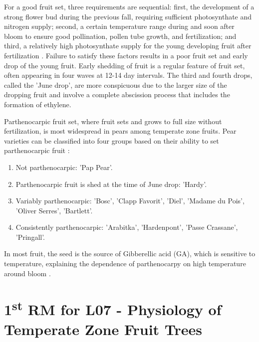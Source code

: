 \vspace{0.5em}
For a good fruit set, three requirements are sequential: first, the development of a strong flower bud during the previous fall, requiring sufficient photosynthate and nitrogen supply; second, a certain temperature range during and soon after bloom to ensure good pollination, pollen tube growth, and fertilization; and third, a relatively high photosynthate supply for the young developing fruit after fertilization \cite*{rmb_01_physiology_temperate_zone_fruit_trees}. Failure to satisfy these factors results in a poor fruit set and early drop of the young fruit. Early shedding of fruit is a regular feature of fruit set, often appearing in four waves at 12-14 day intervals. The third and fourth drops, called the 'June drop', are more conspicuous due to the larger size of the dropping fruit and involve a complete abscission process that includes the formation of ethylene.

\vspace{0.5em}
Parthenocarpic fruit set, where fruit sets and grows to full size without fertilization, is most widespread in pears among temperate zone fruits. Pear varieties can be classified into four groups based on their ability to set parthenocarpic fruit \cite*{rmb_01_physiology_temperate_zone_fruit_trees}: 

\begin{enumerate} 
    \item Not parthenocarpic: 'Pap Pear'. 
    \item Parthenocarpic fruit is shed at the time of June drop: 'Hardy'. 
    \item Variably parthenocarpic: 'Bosc', 'Clapp Favorit', 'Diel', 'Madame du Pois', 'Oliver Serres', 'Bartlett'. 
    \item Consistently parthenocarpic: 'Arabitka', 'Hardenpont', 'Passe Crassane', 'Pringall'. 
\end{enumerate} 

\vspace{0.5em}
In most fruit, the seed is the source of Gibberellic acid (GA), which is sensitive to temperature, explaining the dependence of parthenocarpy on high temperature around bloom \cite*{rmb_01_physiology_temperate_zone_fruit_trees}.



\section{\texorpdfstring{1\textsuperscript{st} RM for L07 - Physiology of Temperate Zone Fruit Trees}{1st RM for L07 - Physiology of Temperate Zone Fruit Trees}}

